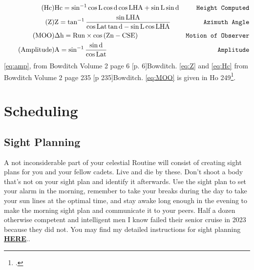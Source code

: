 \documentclass[letterpaper,12pt]{article}
\begin{document}
\begin{align}
	\label{eq:Hc}\tag{Hc}	&\text{Hc}=\sin^{-1}{\cos{\text{L}}\cos{\text{d}}\cos{\text{LHA}}+\sin{\text{L}}\sin{\text{d}}}  &
	\text{\texttt{Height Computed}}\\
	\label{eq:Z}\tag{Z}	   &\text{Z}=\tan^{-1}{\frac{\sin{\text{LHA}}}{\cos{\text{Lat}\tan\text{{d}}-\sin{\text{L}}\cos{\text{LHA}}}}}   &\text{\texttt{Azimuth Angle}}\\
   \label{eq:MOO}\tag{MOO} &\Delta\text{h}=\text{Run}\times\cos{(\text{Zn}-\text{CSE})}  &\text{\texttt{Motion of Observer}}\\
  \label{eq:amp}\tag{Amplitude}&\text{A}=\sin^{-1}\frac{\sin{\text{d}}}{\cos{\text{Lat}}}	&\text{\texttt{Amplitude}}
\end{align}
\ref{eq:amp}, from Bowditch Volume 2 page 6 [p. 6]{Bowditch}.
\ref{eq:Z} and \ref{eq:Hc} from Bowditch Volume 2 page 235 [p 235]{Bowditch}.
\ref{eq:MOO} is given in Ho 249\footcite{ho249}.
\section{Scheduling}
\subsection{Sight Planning}
A not inconsiderable part of your celestial Routine will consist of creating sight plans for you and your fellow cadets.
 Live and die by these.
 Don't shoot a body that's not on your sight plan and identify it afterwards.
 Use the sight plan to set your alarm in the morning, remember to take your breaks during the day to take your sun lines at the optimal time, and stay awake long enough in the evening to make the morning sight plan and communicate it to your peers.
 Half a dozen otherwise competent and intelligent men I know failed their senior cruise in 2023 because they did not.
 You may find my detailed instructions for sight planning \hyperlink{https://www.csum.edu/tutoring/media/celnavjoey.pdf}{\textbf{HERE}}..
\end{document}
